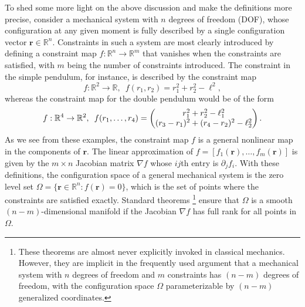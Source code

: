 To shed some more light on the above discussion and make the definitions more precise, consider a mechanical system with $n$ degrees of freedom (DOF), whose configuration at any given moment is fully described by a single configuration vector $\bm{r} \in \mathbb{R}^{n}$.
Constraints in such a system are most clearly introduced by defining a constraint map $f: \mathbb{R}^{n} \to \mathbb{R}^{m}$
that vanishes when the constraints are satisfied, with $m$ being the number of constraints introduced.
The constraint in the simple pendulum, for instance, is described by the constraint map
%
\begin{equation}
    f: \mathbb{R}^{2} \to \mathbb{R},\enspace f(r_{1}, r_{2}) = r_{1}^{2} + r_{2}^{2} - \ell^{2},
\end{equation}
%
whereas the constraint map for the double pendulum would be of the form
%
\begin{equation}
  \def\arraystretch{1}
  f: \mathbb{R}^{4} \to \mathbb{R}^{2},\enspace f(r_{1}, \ldots, r_{4}) =
\begin{pmatrix}
 r_{1}^{2} + r_{2}^{2} - \ell_{1}^{2}\\
 (r_{3} - r_{1})^{2} + (r_{4} - r_{2})^{2} - \ell_{2}^{2}
\end{pmatrix}.
\end{equation}
%
As we see from these examples, the constraint map $f$ is a general nonlinear map in the components of $\bm{r}$.
The linear approximation of $f = [f_{1}(\bm{r}), \ldots, f_{m}(\bm{r})]$ is given by the $m\times n$ Jacobian matrix $\nabla f$ whose $i\!j$th entry is $\partial_{j}f_{i}$.
With these definitions, the configuration space of a general mechanical system is the zero level set $\Omega = \{\bm{r} \in \mathbb{R}^{n} : f(\bm{r}) = 0\}$, which is the set of points where the constraints are satisfied exactly.
Standard theorems%
\footnote{These theorems are almost never explicitly invoked in classical mechanics.
However, they are implicit in the frequently used argument that a mechanical system with $n$ degrees of freedom and $m$ constraints has $(n-m)$ degrees of freedom, with the configuration space $\Omega$ parameterizable by $(n-m)$ generalized coordinates.}
ensure that $\Omega$ is a smooth $(n-m)$-dimensional manifold if the Jacobian $\nabla f$ has full rank for all points in $\Omega$.

